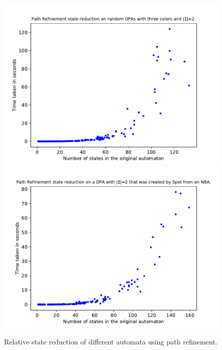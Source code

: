 \begin{figure}
\begin{minipage}{0.49\textwidth}
		\caption{Relative state reduction of different automata using path refinement.}
		\label{exp:fig:path_refinement_reduct_sccs}
	\end{minipage}
	\hfill
	\begin{minipage}{0.49\textwidth}
		\includegraphics[page=5,height=.3\textheight]{../data/analysis/path_refinement/gendet_ap1.pdf} 
		\includegraphics[page=5,height=.3\textheight]{../data/analysis/path_refinement/detspot_ap1.pdf} 

\end{minipage}
\end{figure}

